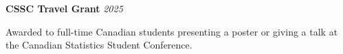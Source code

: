 \vspace*{10pt}
\noindent
\textbf{CSSC Travel Grant}
\hfill \textit{2025}\par
\vspace{3pt}
\noindent
Awarded to full-time Canadian students presenting a poster or
giving a talk at the Canadian Statistics Student Conference.\par